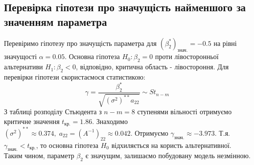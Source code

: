 \documentclass{article}
\begin{document}
    \subsection{Перевірка гіпотези про значущість найменшого за значенням параметра}
      Перевіримо гіпотезу про значущість параметра для $(\beta_2^*)_{\text{знач.}} = 
      -0.5$ на рівні значущості $\alpha = 0.05$. Основна гіпотеза $ H_0 : \beta_2 = 0$ проти лівосторонньої 
      альтернативи $ H_1 : \beta_2 < 0$, відповідно, критична область - 
      лівостороння. Для перевірки гіпотези скористаємося статистикою:
      \begin{equation}
        \gamma = \frac{\beta_2^*}{\sqrt{(\sigma^2)^{**} a_{22}}} \sim St_{n-m}
      \end{equation}
      З таблиці розподілу Стьюдента з $n - m = 8$ ступенями вільності 
      отримуємо критичне значення $t_\text{кр.} = 1.86$. Знаходимо $(\sigma^2)^{**} 
      \approx 0.374, \; a_{22} = (A^{-1})_{22} \approx 0.042$. Отримуємо 
      $\gamma_\text{знач.} \approx -3.973$. Т.я. $\gamma_\text{знач.} < t_\text{кр.}$, 
      то основна гіпотеза $H_0$ відхиляється на користь альтернативної. Таким чином, 
      параметр $\beta_2$ є значущим, залишаємо побудовану модель незмінною.
\end{document}
